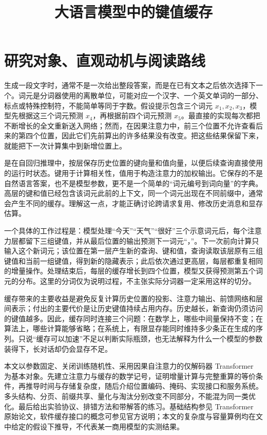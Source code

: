 \documentclass[UTF8,12pt,a4paper,fontset=fandol]{ctexart}
\title{大语言模型中的键值缓存}
\author{}
\date{}
\begin{document}
\maketitle
\tableofcontents

\section{研究对象、直观动机与阅读路线}
\label{sec:kv-introduction}

生成一段文字时，通常不是一次给出整段答案，而是在已有文本之后依次选择下一个。词元是分词器使用的离散单位，可能对应一个汉字、一个英文单词的一部分、标点或特殊控制符，不能简单等同于字数。假设提示包含三个词元 $x_1,x_2,x_3$，模型先根据这三个词元预测 $x_4$，再根据前四个词元预测 $x_5$。最直接的实现每次都把不断增长的全文重新送入网络；然而，在因果注意力中，前三个位置不允许查看后来的第四个位置，因此它们先前算出的许多结果没有改变。把这些结果保留下来，就能把下一次计算集中到新增位置上。

是在自回归推理中，按层保存历史位置的键向量和值向量，以便后续查询直接使用的运行时状态。键用于计算相关性，值用于构造注意力的加权输出。它保存的不是自然语言答案，也不是模型参数，更不是一个简单的“词元编号到词向量”的字典。高层的键和值已经包含该词元此前的上下文，同一个词元出现在不同前缀中，通常会产生不同的缓存。理解这一点，才能正确讨论跨请求复用、修改历史消息和显存估算。

一个具体的工作过程是：模型处理“今天”“天气”“很好”三个示意词元后，每个注意力层都留下三组键值，并从最后位置的输出预测下一词元“，”。下一次前向计算只输入这个新词元；该位置在第一层产生新的查询、键和值，查询读取该层原有三组键值和当前一组键值，得到新的隐藏表示；此后依次通过更高层，每层都重复相同的增量操作。处理结束后，每层的缓存增长到四个位置，模型又获得预测第五个词元的分布。这里的分词仅为说明过程，不主张实际分词器一定采用这样的切分。

缓存带来的主要收益是避免反复计算历史位置的投影、注意力输出、前馈网络和层间表示；付出的主要代价是让历史键值持续占用内存。历史越长，新查询仍须访问的键值越多。因此，缓存同时连接三个问题：在数学上，哪些中间量保持不变；在算法上，哪些计算能够省略；在系统上，有限显存能同时维持多少条正在生成的序列。只说“缓存可以加速”不足以判断实际瓶颈，也无法解释为什么一个模型的参数装得下，长对话却仍会显存不足。

本文以参数固定、关闭训练随机性、采用因果自注意力的仅解码器 Transformer 为基本对象。先建立注意力与缓存的数学记号，证明增量计算与完整重算的等价条件，再推导时间与存储复杂度，随后介绍位置编码、掩码、实现接口和服务系统。多头结构、分页、前缀共享、量化与淘汰分别改变不同部分，不能混为同一类优化。最后给出实验协议、排错方法和带解答的练习。基础结构参见 Transformer 原始论文\cite{transformer}，软件缓存接口的概念可参见官方说明\cite{hf-cache}；本文的复杂度与容量算例均在文中给定的假设下推导，不代表某一商用模型的实测结果。
\end{document}
